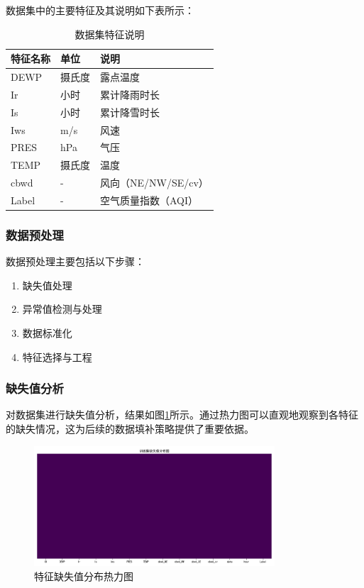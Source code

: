 数据集中的主要特征及其说明如下表所示：

\begin{table}[H]
    \centering
    \begin{tabular}{lll}
        \toprule
        特征名称 & 单位 & 说明 \\
        \midrule
        DEWP & 摄氏度 & 露点温度 \\
        Ir & 小时 & 累计降雨时长 \\
        Is & 小时 & 累计降雪时长 \\
        Iws & m/s & 风速 \\
        PRES & hPa & 气压 \\
        TEMP & 摄氏度 & 温度 \\
        cbwd & - & 风向（NE/NW/SE/cv）\\
        Label & - & 空气质量指数（AQI）\\
        \bottomrule
    \end{tabular}
    \caption{数据集特征说明}
    \label{tab:feature_description}
\end{table}

\subsubsection{数据预处理}
数据预处理主要包括以下步骤：
\begin{enumerate}
    \item 缺失值处理
    \item 异常值检测与处理
    \item 数据标准化
    \item 特征选择与工程
\end{enumerate}

\subsubsection{缺失值分析}
对数据集进行缺失值分析，结果如图\ref{fig:missing_values}所示。通过热力图可以直观地观察到各特征的缺失情况，这为后续的数据填补策略提供了重要依据。

\begin{figure}[H]
    \centering
    \includegraphics[width=0.8\textwidth]{images/missing_values_heatmap.png}
    \caption{特征缺失值分布热力图}
    \label{fig:missing_values}
\end{figure}


